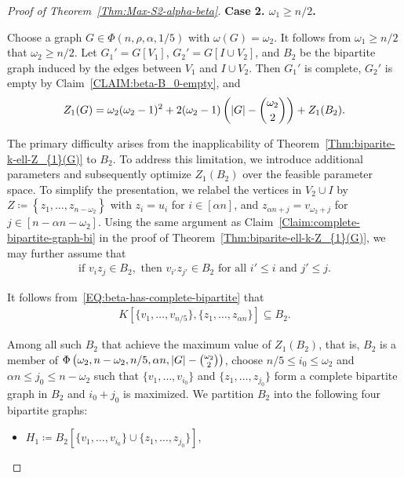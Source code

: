 \documentclass[11pt,a4paper]{article}
\begin{document}
\begin{proof}[Proof of Theorem~\ref{Thm:Max-S2-alpha-beta}]
\textbf{Case 2. $\omega_1 \ge n/2$. }

Choose a graph $G\in \Phi(n, \rho, \alpha, 1/5)$ with $\omega(G) = \omega_2$. 
It follows from $\omega_1 \ge n/2$ that $\omega_2 \ge n/2$. 
Let $G_1' = G[V_1]$, $G_2' = G[I\cup V_2]$, and $B_2$ be the bipartite graph induced by the edges between $V_1$ and $I \cup V_2$. 
Then $G_1'$ is complete, $G_2'$ is empty by Claim~\ref{CLAIM:beta-B_0-empty}, and 
\begin{align}\label{EQ:Z_{1}(G)-B2-omega2-n/5}
Z_{1}(G) 
= \omega_2 (\omega_2 -1)^2 + 2(\omega_2 -1) \left(|G| - \binom{\omega_2}{2}\right) + Z_{1}(B_2). 
\end{align}

The primary difficulty arises from the inapplicability of Theorem~\ref{Thm:biparite-k-ell-Z_{1}(G)} to $B_2$. 
To address this limitation, we introduce additional parameters and subsequently optimize $Z_{1}(B_2)$ over the feasible parameter space. 
To simplify the presentation, we relabel the vertices in $V_2 \cup I$ by $Z \coloneqq \left\{z_1, \ldots, z_{n-\omega_2}\right\}$ with $z_i = u_i$ for $i \in [\alpha n]$, and $z_{\alpha n+j} = v_{\omega_2+j}$ for $j \in [n-\alpha n-\omega_2]$. 
Using the same argument as Claim~\ref{Claim:complete-bipartite-graph-bi} in the proof of Theorem~\ref{Thm:biparite-ell-k-Z_{1}(G)}, we may further assume that 
\begin{align*}
\text{if } v_iz_j\in B_2, \text{ then } v_{i'}z_{j'} \in B_2 \text{ for all } i' \le i \text{ and } j' \le j. 
\end{align*}

It follows from~\eqref{EQ:beta-has-complete-bipartite} that 
\begin{align*}
K[\{v_1, \ldots,v_{n/5}\}, \{z_1, \ldots,z_{\alpha n}\}] \subseteq B_2. 
\end{align*}

Among all such $B_2$ that achieve the maximum value of $Z_{1}(B_2)$, that is, $B_2$ is a member of $\Phi\left(\omega_2,n-\omega_2, n/5, \alpha n, |G|-\tbinom{\omega_2}{2}\right)$, choose $n/5 \le i_0 \le \omega_2$ and $\alpha n \le j_0 \le n-\omega_2$ such that $\{v_1, \ldots, v_{i_0}\}$ and $\{z_1, \ldots, z_{j_0}\}$ form a complete bipartite graph in $B_2$ and $i_0 +j_0$ is maximized. 
We partition $B_2$ into the following four bipartite graphs: 
\begin{itemize}
\item $H_1 \coloneqq B_2\left[\{v_1,\ldots, v_{i_0}\}\cup \{z_1, \ldots, z_{j_0}\}\right]$, 


\end{itemize}
\end{proof}
\end{document}
